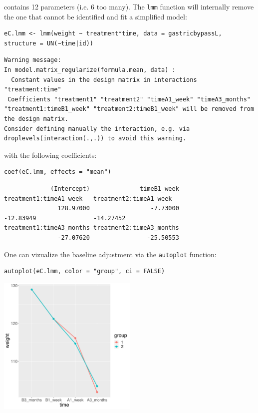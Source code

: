 \documentclass[12pt]{article}
\begin{document}
contains 12 parameters (i.e. 6 too many). The \texttt{lmm} function will
internally remove the one that cannot be identified and fit a
simplified model:
\lstset{language=r,label= ,caption= ,captionpos=b,numbers=none}
\begin{lstlisting}
eC.lmm <- lmm(weight ~ treatment*time, data = gastricbypassL, structure = UN(~time|id))
\end{lstlisting}

\begin{verbatim}
Warning message:
In model.matrix_regularize(formula.mean, data) :
  Constant values in the design matrix in interactions "treatment:time"
 Coefficients "treatment1" "treatment2" "timeA1_week" "timeA3_months" "treatment1:timeB1_week" "treatment2:timeB1_week" will be removed from the design matrix. 
Consider defining manually the interaction, e.g. via droplevels(interaction(.,.)) to avoid this warning.
\end{verbatim}


with the following coefficients:
\lstset{language=r,label= ,caption= ,captionpos=b,numbers=none}
\begin{lstlisting}
coef(eC.lmm, effects = "mean")
\end{lstlisting}

\begin{verbatim}
             (Intercept)              timeB1_week   treatment1:timeA1_week   treatment2:timeA1_week 
               128.97000                 -7.73000                -12.83949                -14.27452 
treatment1:timeA3_months treatment2:timeA3_months 
               -27.07620                -25.50553
\end{verbatim}


One can vizualize the baseline adjustment via the \texttt{autoplot} function:
\lstset{language=r,label= ,caption= ,captionpos=b,numbers=none}
\begin{lstlisting}
autoplot(eC.lmm, color = "group", ci = FALSE)
\end{lstlisting}

\begin{center}
\includegraphics[width=0.5\textwidth]{./figures/gg-baseAdj.pdf}
\end{center}
\end{document}
